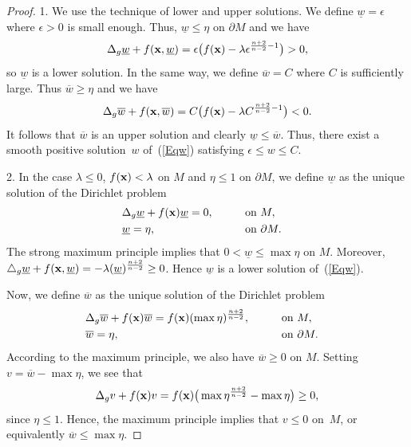 \documentclass[pdftex]{sigma}
\numberwithin{equation}{section}
\begin{document}
\begin{proof}1. We use the technique of lower and upper solutions. We define ${\underline{w}}= \epsilon$ where $\epsilon>0$ is small enough. Thus, $\underline{w} \leq \eta$ on
$\partial M$ and we have
\[
\Delta_g \underline{w} + f({\bf x}, \underline{w} ) =
\epsilon \big( f({\bf x}) -\lambda \epsilon^{{\frac{n+2}{n-2}} -1} \big) >0,
\]
so $\underline{w}$ is a lower solution. In the same way, we define $\overline{w} = C$ where $C$ is sufficiently large. Thus $\overline{w} \geq \eta$ and we have
\[
\Delta_g \overline{w} + f({\bf x}, \overline{w}) = C \big( f({\bf x}) -\lambda C^{{\frac{n+2}{n-2}} -1} \big) <0.
\]
It follows that $\overline{w}$ is an upper solution and clearly $\underline{w} \leq \overline{w}$. Thus, there exist a smooth positive solution~$w$ of~(\ref{Eqw}) satisfying $\epsilon \leq w \leq C$.

2. In the case $\lambda \leq 0$, $f({\bf x}) < \lambda$ on $M$ and $\eta \leq 1$ on $\partial M$, we define ${\underline{w}}$ as the unique solution of the Dirichlet problem
\begin{alignat*}{3}
 & \Delta_g \underline{w} + f({\bf x}) \underline{w} = 0 ,\qquad & & \textrm{on} \ M,&\nonumber \\
 & \underline{w} = \eta, \qquad && \textrm{on} \ \partial M.& %
\end{alignat*}
The strong maximum principle implies that $0 < \underline{w} \leq \max \eta$ on $M$.
Moreover, $\triangle_g \underline{w} + f({\bf x}, \underline{w}) = -\lambda (\underline{w})^{\frac{n+2}{n-2}} \geq 0$. Hence $\underline{w}$ is a lower solution of~(\ref{Eqw}).

Now, we define ${\overline{w}}$ as the unique solution of the Dirichlet problem
\begin{alignat*}{3} %
 & \Delta_g \overline{w} + f({\bf x}) \overline{w} = f({\bf x}) (\max \eta)^{\frac{n+2}{n-2}} , \qquad && \textrm{on} \ M,& \\
 & \overline{w} = \eta, && \textrm{on} \ \partial M.&
\end{alignat*}
According to the maximum principle, we also have $\overline{w} \geq 0$ on $M$. Setting $v = \overline{w}- \max \eta$, we see that
\[
\Delta_g v + f({\bf x}) v = f({\bf x}) \big(\max \eta^{\frac{n+2}{n-2}} - \max \eta\big) \geq 0,
\]
since $\eta \leq 1$. Hence, the maximum principle implies that $v \leq 0$ on~$M$, or equivalently $ \overline{w} \leq \max \eta$.


\end{proof}
\end{document}
